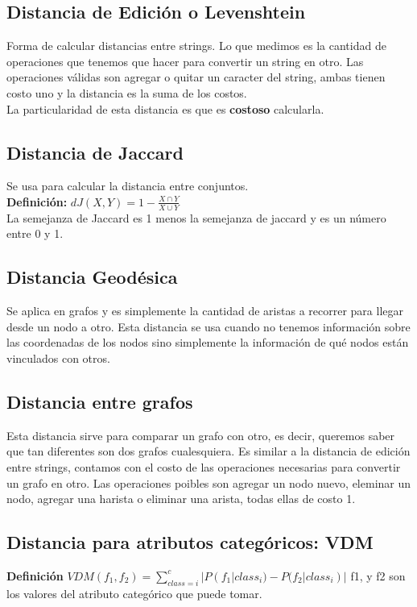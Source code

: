 \documentclass[titlepage,a4paper]{article}
\begin{document}
\subsection*{Distancia de Edición o Levenshtein}
Forma de calcular distancias entre strings. Lo que medimos es la cantidad de operaciones que tenemos que hacer para convertir un string en otro. Las operaciones válidas son agregar o quitar un caracter del string, ambas tienen costo uno y la distancia es la suma de los costos.  \\

La particularidad de esta distancia es que es \textbf{costoso} calcularla. \\

\subsection*{Distancia de Jaccard}
Se usa para calcular la distancia entre conjuntos. \\

\textbf{Definición:} $dJ(X,Y) = 1 -\frac{X\cap Y}{X\cup Y}$\\

La semejanza de Jaccard es 1 menos la semejanza de jaccard y es un número entre 0 y 1. 

\subsection*{Distancia Geodésica}
Se aplica en grafos y es simplemente la cantidad de aristas a recorrer para llegar desde un nodo a otro. Esta distancia se usa cuando no tenemos información sobre las coordenadas de los nodos sino simplemente la información de qué nodos están vinculados con otros. 

\subsection*{Distancia entre grafos}
Esta distancia sirve para comparar un grafo con otro, es decir, queremos saber que tan diferentes son dos grafos cualesquiera. Es similar a la distancia de edición entre strings, contamos con el costo de las operaciones necesarias para convertir un grafo en otro. Las operaciones poibles son agregar un nodo nuevo, eleminar un nodo, agregar una harista o eliminar una arista, todas ellas de costo 1. 

\subsection*{Distancia para atributos categóricos: VDM}
\textbf{Definición} $VDM(f_1,f_2) = \displaystyle\sum_{class = i} ^c |P(f_1|class_i)-P(f_2|class_i)|$
f1, y f2 son los valores del atributo categórico que puede tomar. 
\end{document}
